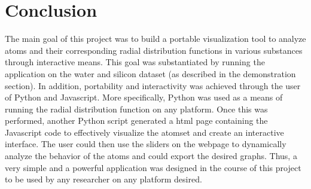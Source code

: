 \section*{Conclusion}

The main goal of this project was to build a portable visualization tool to analyze atoms and their corresponding radial distribution functions in various substances through interactive means. This goal was substantiated by running the application on the water and silicon dataset (as described in the demonstration section). In addition, portability and interactivity was achieved through the user of Python and Javascript. More specifically, Python was used as a means of running the radial distribution function on any platform. Once this was performed, another Python script generated a html page containing the Javascript code to effectively visualize the atomset and create an interactive interface. The user could then use the sliders on the webpage to dynamically analyze the behavior of the atoms and could export the desired graphs. Thus, a very simple and a powerful application was designed in the course of this project to be used by any researcher on any platform desired.